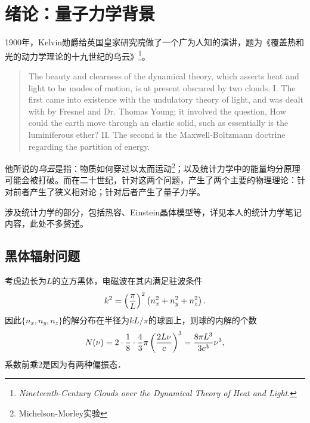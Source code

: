 \def\coursename{量子力学}
\def\courseEnglishname{Quantum Mechanics}
\def\teachername{陈新老师、郭永}
\def\beginday{2022/3/25}




\let\oldr\r
\renewcommand*{\r}{\bm r}						%
\newcommand{\qo}[1]{\bm{\hat #1}\!\mathop{}}	%
\newcommand{\cmm}[2]{\zkh{\hat #1,\hat #2}}		%
\newcommand{\acmm}[2]{\{\hat #1,\hat #2\}}

\newcommand{\Larmor}{\mathrm L}
\newcommand{\Hall}{\mathrm H}

\newcommand{\cyc}{\mathrm c}
\DeclareMathOperator{\Cle}{C}



\firstandforemost

\setcounter{section}{-1}
\section{绪论：量子力学背景}
1900年，Kelvin勋爵给英国皇家研究院做了一个广为人知的演讲，题为《覆盖热和光的动力学理论的十九世纪的乌云》\footnote{\textit{Nineteenth-Century Clouds over the Dynamical Theory of Heat and Light}. }。
\begin{quote}
	The beauty and clearness of the dynamical theory, which asserts heat and light to be modes of motion, is at present obscured by two clouds.
	I. The first came into existence with the undulatory theory of light, and was dealt with by Fresnel and Dr. Thomas Young; it involved the question, How could the earth move through an elastic solid, such as essentially is the luminiferous ether?
	II. The second is the Maxwell-Boltzmann doctrine regarding the partition of energy.
\end{quote}
他所说的\textit{乌云}是指：物质如何穿过以太而运动\footnote{Michelson-Morley实验}；以及统计力学中的能量均分原理可能会被打破。而在二十世纪，针对这两个问题，产生了两个主要的物理理论：针对前者产生了狭义相对论；针对后者产生了量子力学。%

涉及统计力学的部分，包括热容、Einstein晶体模型等，详见本人的统计力学笔记内容，此处不多赘述。
\subsection{黑体辐射问题}
考虑边长为$L$的立方黑体，电磁波在其内满足驻波条件
\[
	k^2=\left(\frac\pi{L}\right)^2\left(n_x^2+n_y^2+n_z^2\right).
\]
因此$\{n_x,n_y,n_z\}$的解分布在半径为$kL/\pi$的球面上，则球的内解的个数
\[
	N(\nu)=2\cdot\frac18\cdot\frac43\pi\left(\frac{2L\nu}c\right)^3=\frac{8\pi L^3}{3c^3}\nu^3,
\]
系数前乘2是因为有两种偏振态．

